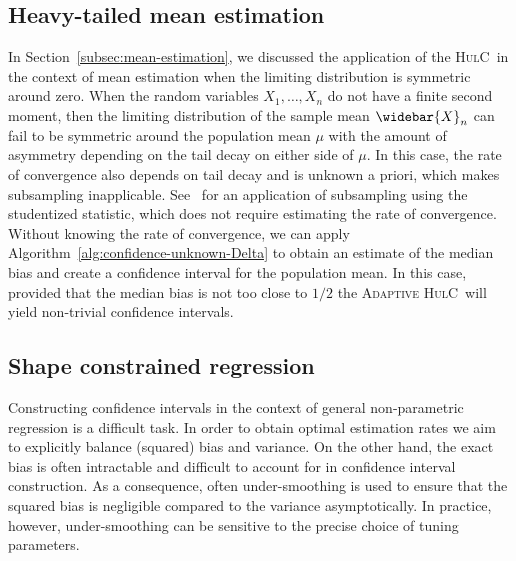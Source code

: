 \documentclass{article}
\newcommand{\hulc}{\textsc{HulC}~}
\newcommand{\ahulc}{\textsc{Adaptive HulC}~}
\numberwithin{myalgctr}{section}
\begin{document}
\subsection{Heavy-tailed mean estimation}\label{subsec:heavy-tailed-mean}
In Section~\ref{subsec:mean-estimation}, we discussed the application of the \hulc in the context of mean estimation when the limiting distribution is symmetric around zero. When the random variables $X_1, \ldots, X_n$ do not have a finite second moment, then the limiting distribution of the sample mean $\widebar{X}_n$ can {\color{black}fail to be} symmetric around the population mean $\mu$ with the amount of asymmetry depending on the tail decay on either side of $\mu$. In this case, the rate of convergence also depends on tail decay and is unknown a priori, which makes subsampling inapplicable. See~\cite{romano1999subsampling} for an application of subsampling using the studentized statistic, which does not require estimating the rate of convergence. Without knowing the rate of convergence, we can apply Algorithm~\ref{alg:confidence-unknown-Delta} to obtain an estimate of the median bias and create a confidence interval for the population mean. In this case, provided that the median bias
is not too close to $1/2$ the \ahulc will yield non-trivial confidence intervals. 
\subsection{Shape constrained regression}\label{subsec:shape-constrained}
Constructing confidence intervals in the context of general non-parametric regression is a difficult task.
In order to obtain optimal estimation rates we aim to explicitly balance (squared) bias and variance. On the other hand, the exact bias is often intractable and difficult to account for in confidence interval construction. As a consequence, often under-smoothing is used to ensure that the squared bias is negligible compared to the variance asymptotically. In practice, however, under-smoothing can be sensitive to the precise choice of tuning parameters.
\end{document}
